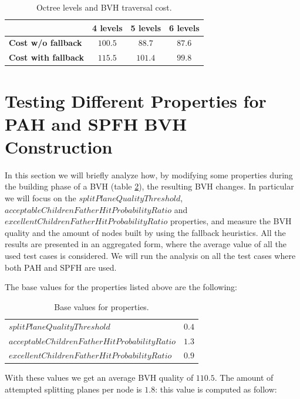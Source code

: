 \documentclass{PoliMi_MasterThesis}
\begin{document}
\begin{table}[H]
    \centering
    \begin{tabular}{|l|c|c|c|}
		\hline
        & \textbf{4 levels} & \textbf{5 levels} &\textbf{6 levels}\\
		\hline \hline
		\textbf{Cost w/o fallback}& $100.5$ & $88.7$ & $87.6$ \\
		\textbf{Cost with fallback} & $115.5$ & $101.4$ & $99.8$ \\
		\hline
    \end{tabular}
	\caption{Octree levels and BVH traversal cost.}
	\label{tab:levels_vs_quality}
\end{table}

\section{Testing Different Properties for PAH and SPFH BVH Construction} \label{sec:testing_different_properties}
In this section we will briefly analyze how, by modifying some properties during the building phase of a BVH (table \ref{tab:standard_properties}), the resulting BVH changes. In particular we will focus on the $splitPlaneQualityThreshold$, $acceptableChildrenFatherHitProbabilityRatio$ and $excellentChildrenFatherHitProbabilityRatio$ properties, and measure the BVH quality and the amount of nodes built by using the fallback heuristics. All the results are presented in an aggregated form, where the average value of all the used test cases is considered. We will run the analysis on all the test cases where both PAH and SPFH are used.

The base values for the properties listed above are the following:

\begin{table}[H]
    \centering
    \begin{tabular}{|l|c|}
		\hline
        \boldmath$splitPlaneQualityThreshold$ & $0.4$\\
		\boldmath$acceptableChildrenFatherHitProbabilityRatio$ & $1.3$\\
		\boldmath$excellentChildrenFatherHitProbabilityRatio$ & $0.9$\\
		\hline
    \end{tabular}
	\caption{Base values for properties.}
	\label{tab:standard_properties}
\end{table}

With these values we get an average BVH quality of $110.5$. The amount of attempted splitting planes per node is $1.8$: this value is computed as follow: 
\end{document}
